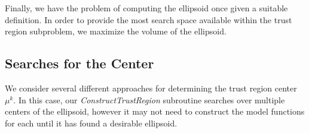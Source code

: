 Finally, we have the problem of computing the ellipsoid once given a suitable definition.
In order to provide the most search space available within the trust region subproblem, we maximize the volume of the ellipsoid.

\subsection{Searches for the Center}

We consider several different approaches for determining the trust region center $\mu^k$.
In this case, our \emph{ConstructTrustRegion} subroutine searches over multiple centers of the ellipsoid, however it may not need to construct the model functions for each until it has found a desirable ellipsoid.






%            



